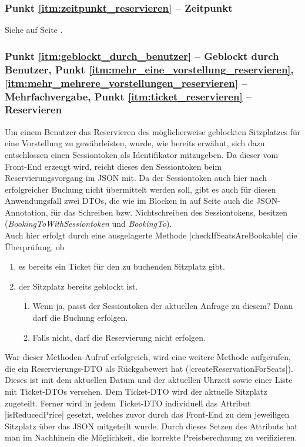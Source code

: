 \subsubsection*{Punkt \ref{itm:zeitpunkt_reservieren} -- Zeitpunkt}
\label{ssssec:Zeitpunkt_reservieren}
Siehe   auf Seite \pageref{ssssec:Zeitpunkt}.

\subsubsection*{Punkt \ref{itm:geblockt_durch_benutzer} -- Geblockt durch Benutzer, Punkt \ref{itm:mehr_eine_vorstellung_reservieren}, \ref{itm:mehr_mehrere_vorstellungen_reservieren} -- Mehrfachvergabe, Punkt \ref{itm:ticket_reservieren} -- Reservieren}
\label{ssssec:geblockt_durch_benutzer}
Um einem Benutzer das Reservieren des möglicherweise geblockten Sitzplatzes für eine Vorstellung zu gewährleisten, wurde, wie bereits erwähnt, sich dazu entschlossen einen Sessiontoken als Identifikator mitzugeben.
Da dieser vom Front-End erzeugt wird, reicht dieses den Sessiontoken beim Reservierungsvorgang im \acs{JSON} mit.
Da der Sessiontoken auch hier nach erfolgreicher Buchung nicht übermittelt werden soll, gibt es auch für diesen Anwendungsfall zwei \acp{DTO}, die wie im  Blocken in  auf Seite \pageref{ssssec:Bezeichner} auch die \acs{JSON}-Annotation, für das Schreiben bzw. Nichtschreiben des Sessiontokens, besitzen (\textit{BookingToWithSessiontoken} und \textit{BookingTo}). \\

Auch hier erfolgt durch eine ausgelagerte Methode \jinline |checkIfSeatsAreBookable| die Überprüfung, ob
\begin{enumerate}
	\item es bereits ein Ticket für den zu buchenden Sitzplatz gibt.
	\item der Sitzplatz bereits geblockt ist.
	\begin{enumerate}
		\item Wenn ja, passt der Sessiontoken der aktuellen Anfrage zu diesem? Dann darf die Buchung erfolgen.
		\item Falls nicht, darf die Reservierung nicht erfolgen.
	\end{enumerate}
\end{enumerate}

War dieser Methoden-Aufruf erfolgreich, wird eine weitere Methode aufgerufen, die ein Reservierungs-\acs{DTO} als Rückgabewert hat (\jinline |createReservationForSeats|). \\
Dieses ist mit dem aktuellen Datum und der aktuellen Uhrzeit sowie einer Liste mit Ticket-\acp{DTO} versehen.
Dem Ticket-\acs{DTO} wird der aktuelle Sitzplatz zugeteilt.
Ferner wird in jedem Ticket-\acs{DTO} individuell das Attribut \jinline |isReducedPrice| gesetzt, welches zuvor durch das Front-End zu dem jeweiligen Sitzplatz über das \acs{JSON} mitgeteilt wurde.
Durch dieses Setzen des Attributs hat man im Nachhinein die Möglichkeit, die korrekte Preisberechnung zu verifizieren. \\

